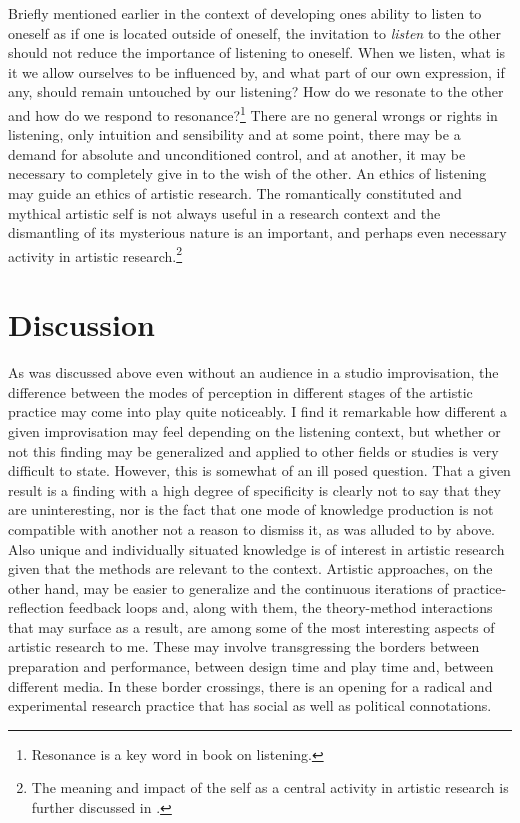 \documentclass[11pt]{article}
\begin{document}
Briefly mentioned earlier in the context of developing ones ability
to listen to oneself as if one is located outside of oneself, the
invitation to \emph{listen} to the other should not reduce the
importance of listening to oneself. When we listen, what is it we
allow ourselves to be influenced by, and what part of our own
expression, if any, should remain untouched by our listening? How do
we resonate to the other and how do we respond to
resonance?\footnote{Resonance is a key word in \citet{nancy2007} book
  on listening.} There are no general wrongs or rights in listening,
only intuition and sensibility and at some point, there may be a
demand for absolute and unconditioned control, and at another, it may
be necessary to completely give in to the wish of the other. An ethics
of listening may guide an ethics of artistic research. The
romantically constituted and mythical artistic self is not always
useful in a research context and the dismantling of its mysterious
nature is an important, and perhaps even necessary activity in
artistic research.\footnote{The meaning and impact of the self as a
  central activity in artistic research is further discussed in
  \citet{frisk12-improv}.}


\section*{Discussion}
\label{sec:discussion}


As was discussed above even without an audience in a studio
improvisation, the difference between the modes of perception in
different stages of the artistic practice may come into play quite
noticeably. I find it remarkable how different a given improvisation
may feel depending on the listening context, but whether or not this
finding may be generalized and applied to other fields or studies is
very difficult to state. However, this is somewhat of an ill posed
question. That a given result is a finding with a high degree of
specificity is clearly not to say that they are uninteresting, nor is
the fact that one mode of knowledge production is not compatible with
another not a reason to dismiss it, as was alluded to by
\citet{Busch2009} above. Also unique and individually situated
knowledge is of interest in artistic research given that the methods
are relevant to the context. Artistic approaches, on the other hand,
may be easier to generalize and the continuous iterations of
practice-reflection feedback loops and, along with them, the
theory-method interactions that may surface as a result, are among
some of the most interesting aspects of artistic research to me. These
may involve transgressing the borders between preparation and
performance, between design time and play time and, between different
media. In these border crossings, there is an opening for a radical
and experimental research practice that has social as well as
political connotations.
\end{document}
